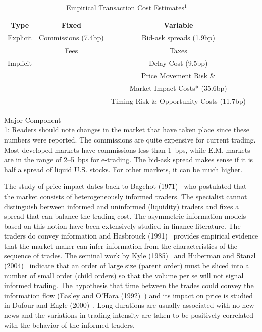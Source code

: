 \begin{table}[!ht]
	\caption{Empirical Transaction Cost Estimates$^1$ \label{tab:empttrans}}	
		\begin{tabular}{|c|c|c|}
		Type & Fixed & Variable\\ \hline
		\hline
		Explicit & Commissions (7.4bp) & Bid-ask spreads (1.9bp)\\ \hline
		& Fees & Taxes\\ \hline
		\hline
		Implicit & & Delay Cost (9.5bp)\\ \hline
		 & & Price Movement Risk \& \\
		 & & Market Impact Costs* (35.6bp)\\ \hline
		 & & Timing Risk \& Opportunity Costs (11.7bp)\\ \hline 
		\end{tabular}
\small *Major Component \\ 1: Readers should note changes in the market that have taken place since these numbers were reported. The commissions are quite expensive for current trading. Most developed markets  have commissions less than 1~bps, while E.M. markets are in the range of 2--5~bps for e-trading. The bid-ask spread makes sense if it is half a spread of liquid U.S. stocks. For other markets, it can be much higher.  \normalsize
\end{table}


The study of price impact dates back to Bagehot (1971)~\cite{} who postulated that the market consists of heterogeneously informed traders. The specialist cannot distinguish between informed and uninformed (liquidity) traders and fixes a spread that can balance the trading cost. The asymmetric information models based on this notion have been extensively studied in finance literature. The traders do convey information and Hasbrouck (1991)~\cite{hasbrouk} provides empirical evidence that the market maker can infer information from the characteristics of the sequence of trades. The seminal work by Kyle (1985)~\cite{kyle1985} and Huberman and Stanzl (2004)~\cite{huberstan} indicate that an order of large size (parent order) must be sliced into a number of small order (child orders) so that the volume per se will not signal informed trading. The hypothesis that time between the trades could convey the information flow (Easley and O'Hara (1992)~\cite{easleyo}) and its impact on price is studied in Dufour and Engle (2000)~\cite{dufour}. Long durations are usually associated with no new news and the variations in trading intensity are taken to be positively correlated with the behavior of the informed traders. \\


